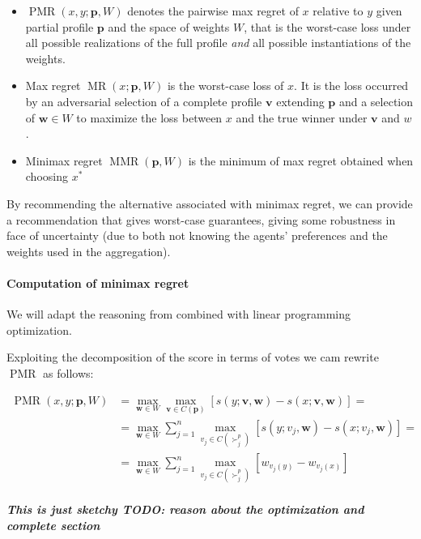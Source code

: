 \documentclass[12pt]{article}
\newcommand{\profile}{\textbf{v}}%
\newcommand{\pprofile}{\textbf{p}}%
\newcommand{\w}{\textbf{w}}%
\DeclareMathOperator{\PMR}{PMR}
\DeclareMathOperator{\MR}{MR}
\DeclareMathOperator{\MMR}{MMR}
\begin{document}
\begin{itemize}
 \item $\PMR(x,y;\pprofile,W)$ denotes the pairwise max regret of $x$ relative to $y$ given partial profile $\pprofile$ and the space of weights $W$, that is the worst-case loss under all possible realizations of the full profile {\em and} all possible instantiations of the weights.
 \item Max regret $\MR(x;\pprofile,W)$ is the worst-case loss of $x$. It is the loss occurred by an adversarial selection of a complete profile $\profile$ extending $\pprofile$ and a selection of $\w \in W$ to maximize the loss between $x$ and the true winner under $\profile$ and $w$.
 \item Minimax regret $\MMR(\pprofile,W)$ is the minimum of max regret obtained when choosing $x^*$
\end{itemize}
By recommending the alternative associated with minimax regret, we can provide a recommendation that gives worst-case guarantees, giving some robustness in face of uncertainty (due to both not knowing the agents' preferences and the weights used in the aggregation).

\paragraph{Computation of minimax regret}

We will adapt the reasoning from \cite{Lu2011} combined with linear programming optimization.

Exploiting the decomposition of the score in terms of votes we cam rewrite $\PMR$ as follows:

\begin{align*}
\PMR(x,y; \pprofile, W) &= \max_{\w \in W} \max_{\profile \in C(\pprofile)} [ s(y; \profile,\w) - s(x; \profile,\w) ] = \\
&=  \max_{\w \in W} \sum_{j=1}^{n} \max_{v_j \in C(\succ_j^p)} [s(y; v_j,\w) - s(x; v_j,\w)]=\\
&=  \max_{\w \in W} \sum_{j=1}^{n} \max_{v_j \in C(\succ_j^p)} [w_{v_j(y)} - w_{v_j(x)}] \\
\end{align*}

{\bf \em This is just sketchy TODO: reason about the optimization and complete section}
\end{document}
